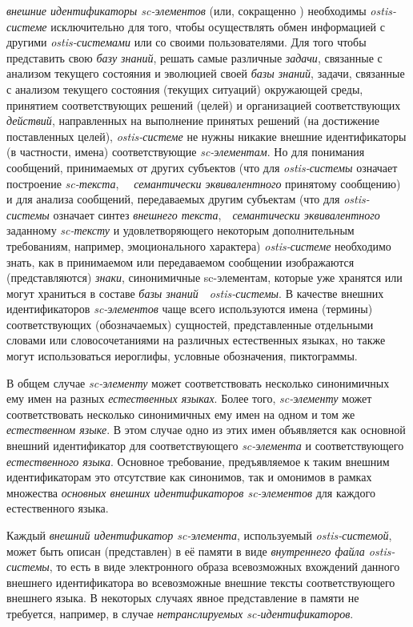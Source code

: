 \textit{внешние идентификаторы sc-элементов} (или, сокращенно ) необходимы \mbox{\textit{ostis-системе}} исключительно для того, чтобы осуществлять обмен информацией с другими \textit{ostis-системами} или со своими пользователями. Для того чтобы представить свою \textit{базу знаний}, решать самые различные \textit{задачи}, связанные с анализом текущего состояния и эволюцией своей \textit{базы знаний}, задачи, связанные с анализом текущего состояния (текущих ситуаций) окружающей среды, принятием соответствующих решений (целей) и организацией соответствующих \textit{действий}, направленных на выполнение принятых решений (на достижение поставленных целей), \textit{ostis-системе} не нужны никакие внешние идентификаторы (в частности, имена) соответствующие \textit{sc-элементам}. Но для понимания сообщений, принимаемых от других субъектов (что для \textit{ostis-системы} означает построение \textit{sc-текста},~~ \textit{семантически эквивалентного} принятому сообщению) и для анализа сообщений, передаваемых другим субъектам (что для \textit{ostis-системы} означает синтез \textit{внешнего текста},~~\textit{семантически эквивалентного} заданному \textit{sc-тексту} и удовлетворяющего некоторым дополнительным требованиям, например, эмоционального характера) \textit{ostis-системе} необходимо знать, как в принимаемом или передаваемом сообщении изображаются (представляются) \textit{знаки}, синонимичные sc-элементам, которые уже хранятся или могут храниться в составе \textit{базы знаний}~~\textit{ostis-системы}. В качестве внешних идентификаторов \textit{sc-элементов} чаще всего используются имена (термины) соответствующих (обозначаемых) сущностей, представленные отдельными словами или словосочетаниями на различных естественных языках, но также могут использоваться иероглифы, условные обозначения, пиктограммы.

В общем случае \textit{sc-элементу} может соответствовать несколько синонимичных ему имен на разных \textit{естественных языках}. Более того, \textit{sc-элементу} может соответствовать несколько синонимичных ему имен на одном и том же \textit{естественном языке}. В этом случае одно из этих имен объявляется как основной внешний идентификатор для соответствующего \textit{sc-элемента} и соответствующего \textit{естественного языка}. Основное требование, предъявляемое к таким внешним идентификаторам это отсутствие как синонимов, так и омонимов в рамках множества \textit{основных внешних идентификаторов sc-элементов} для каждого естественного языка. 

Каждый \textit{внешний идентификатор sc-элемента}, используемый \textit{ostis-системой}, может быть описан (представлен) в её памяти в виде \textit{внутреннего файла ostis-системы}, то есть в виде электронного образа всевозможных вхождений данного внешнего идентификатора во всевозможные внешние тексты соответствующего внешнего языка. В некоторых случаях явное представление в памяти не требуется, например, в случае \textit{нетранслируемых sc-идентификаторов}.

